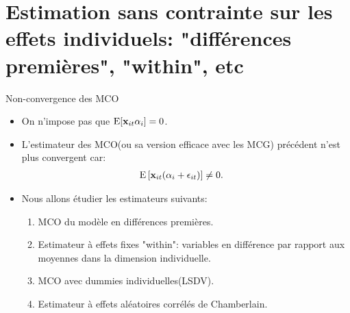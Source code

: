 \section{Estimation sans contrainte sur les effets individuels: "différences premières", "within", etc}
\frame{\sectionpage}
\begin{frame}[allowframebreaks]{Non-convergence des MCO}
    \begin{itemize}
        \item On n'impose pas que $\operatorname{E}[{\mathbf x}_{it}\alpha_i] = 0$.
        \item L'estimateur des MCO(ou sa version efficace avec les MCG) précédent n'est plus convergent 
        car:
        \begin{align*}
            \operatorname{E}\left[{\mathbf x}_{it}(\alpha_i + \epsilon_{it})\right]& \neq 0.
        \end{align*}
        \item Nous allons étudier les estimateurs suivants:
        \begin{enumerate}[$\star$]
            \item MCO du modèle en différences premières.
            \item Estimateur à effets fixes "within": variables en différence par rapport aux moyennes dans la dimension individuelle.
            \item MCO avec dummies individuelles(LSDV).
            \item Estimateur à effets aléatoires corrélés de Chamberlain.
            \end{enumerate}
    \end{itemize}
\end{frame}

